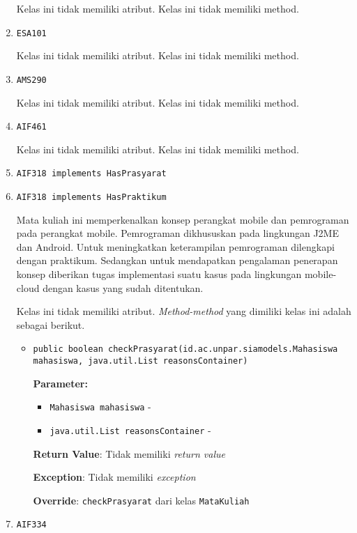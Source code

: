 \documentclass{article}
\begin{document}
\begin{enumerate}
Kelas ini tidak memiliki atribut. Kelas ini tidak memiliki method. \item \texttt{ESA101}



Kelas ini tidak memiliki atribut. Kelas ini tidak memiliki method. \item \texttt{AMS290}



Kelas ini tidak memiliki atribut. Kelas ini tidak memiliki method. \item \texttt{AIF461}



Kelas ini tidak memiliki atribut. Kelas ini tidak memiliki method. \item \texttt{AIF318 implements HasPrasyarat}

\item \texttt{AIF318 implements HasPraktikum}

Mata kuliah ini memperkenalkan konsep perangkat mobile dan pemrograman pada perangkat 
 mobile. Pemrograman dikhususkan pada lingkungan J2ME dan Android.
 Untuk meningkatkan keterampilan pemrograman dilengkapi dengan praktikum. 
 Sedangkan untuk mendapatkan pengalaman penerapan konsep diberikan tugas implementasi suatu 
 kasus pada lingkungan mobile-cloud dengan kasus yang sudah ditentukan.

Kelas ini tidak memiliki atribut. \textit{Method-method} yang dimiliki kelas ini adalah sebagai berikut.
\begin{itemize}
\item \texttt{public boolean checkPrasyarat(id.ac.unpar.siamodels.Mahasiswa mahasiswa, java.util.List reasonsContainer)}



\textbf{Parameter:}
\begin{itemize}
\item \texttt{Mahasiswa mahasiswa} - 
\item \texttt{java.util.List reasonsContainer} - 
\end{itemize}
\textbf{Return Value}: Tidak memiliki \textit{return value}

\textbf{Exception}: Tidak memiliki \textit{exception}

\textbf{Override}: \texttt{checkPrasyarat} dari kelas \texttt{MataKuliah}

\end{itemize}
\item \texttt{AIF334}




\end{enumerate}
\end{document}
